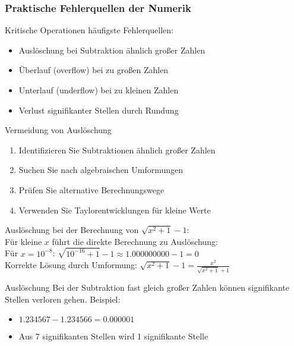 \subsubsection{Praktische Fehlerquellen der Numerik}

\begin{concept}{Kritische Operationen} häufigste Fehlerquellen:
\begin{itemize}
    \item Auslöschung bei Subtraktion ähnlich großer Zahlen
    \item Überlauf (overflow) bei zu großen Zahlen
    \item Unterlauf (underflow) bei zu kleinen Zahlen
    \item Verlust signifikanter Stellen durch Rundung
\end{itemize}
\end{concept}



\begin{KR}{Vermeidung von Auslöschung}
\begin{enumerate}
    \item Identifizieren Sie Subtraktionen ähnlich großer Zahlen
    \item Suchen Sie nach algebraischen Umformungen
    \item Prüfen Sie alternative Berechnungswege
    \item Verwenden Sie Taylorentwicklungen für kleine Werte
\end{enumerate}
\end{KR}

\begin{example2}{Auslöschung} bei der Berechnung von $\sqrt{x^2 + 1} - 1$:
    \vspace{1mm}\\
    Für kleine $x$ führt die direkte Berechnung zu Auslöschung:
    \vspace{1mm}\\
    Für $x = 10^{-8}$: $\sqrt{10^{-16} + 1} - 1 \approx 1.000000000 - 1 = 0$
    \vspace{1mm}\\
    Korrekte Lösung durch Umformung: $\sqrt{x^2 + 1} - 1 = \frac{x^2}{\sqrt{x^2 + 1} + 1}$
\end{example2}

\begin{remark2}{Auslöschung}
    Bei der Subtraktion fast gleich großer Zahlen können signifikante Stellen verloren gehen. Beispiel:
    \begin{itemize}
        \item $1.234567 - 1.234566 = 0.000001$
        \item Aus 7 signifikanten Stellen wird 1 signifikante Stelle
    \end{itemize}
\end{remark2}


